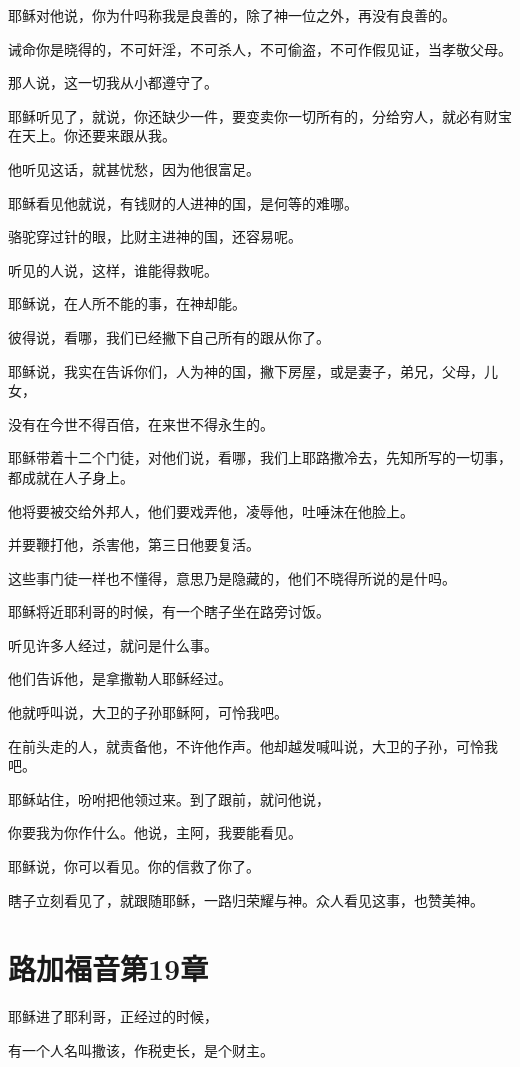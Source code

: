 \documentclass[12pt,oneside]{book}
\begin{document}
耶稣对他说，你为什吗称我是良善的，除了神一位之外，再没有良善的。

诫命你是晓得的，不可奸淫，不可杀人，不可偷盗，不可作假见证，当孝敬父母。

那人说，这一切我从小都遵守了。

耶稣听见了，就说，你还缺少一件，要变卖你一切所有的，分给穷人，就必有财宝在天上。你还要来跟从我。

他听见这话，就甚忧愁，因为他很富足。

耶稣看见他就说，有钱财的人进神的国，是何等的难哪。

骆驼穿过针的眼，比财主进神的国，还容易呢。

听见的人说，这样，谁能得救呢。

耶稣说，在人所不能的事，在神却能。

彼得说，看哪，我们已经撇下自己所有的跟从你了。

耶稣说，我实在告诉你们，人为神的国，撇下房屋，或是妻子，弟兄，父母，儿女，

没有在今世不得百倍，在来世不得永生的。

耶稣带着十二个门徒，对他们说，看哪，我们上耶路撒冷去，先知所写的一切事，都成就在人子身上。

他将要被交给外邦人，他们要戏弄他，凌辱他，吐唾沫在他脸上。

并要鞭打他，杀害他，第三日他要复活。

这些事门徒一样也不懂得，意思乃是隐藏的，他们不晓得所说的是什吗。

耶稣将近耶利哥的时候，有一个瞎子坐在路旁讨饭。

听见许多人经过，就问是什么事。

他们告诉他，是拿撒勒人耶稣经过。

他就呼叫说，大卫的子孙耶稣阿，可怜我吧。

在前头走的人，就责备他，不许他作声。他却越发喊叫说，大卫的子孙，可怜我吧。

耶稣站住，吩咐把他领过来。到了跟前，就问他说，

你要我为你作什么。他说，主阿，我要能看见。

耶稣说，你可以看见。你的信救了你了。

瞎子立刻看见了，就跟随耶稣，一路归荣耀与神。众人看见这事，也赞美神。

\chapter{路加福音第19章}
耶稣进了耶利哥，正经过的时候，

有一个人名叫撒该，作税吏长，是个财主。
\end{document}
